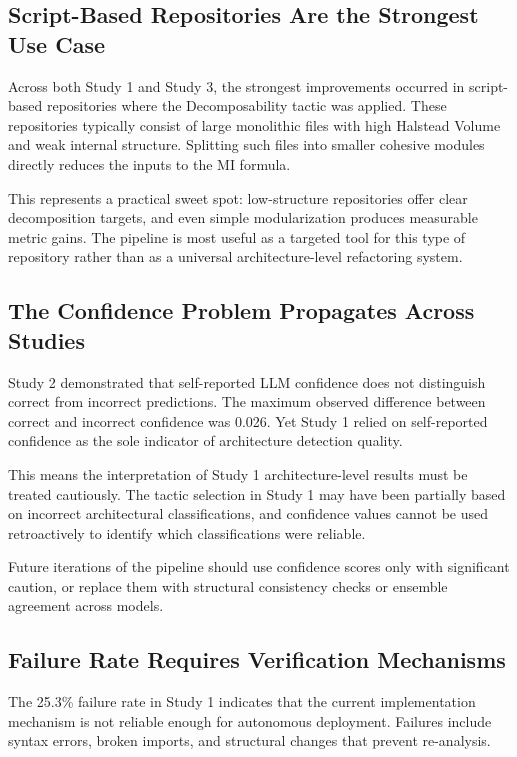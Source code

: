 \subsection{Script-Based Repositories Are the Strongest Use Case}

Across both Study 1 and Study 3, the strongest improvements occurred in script-based repositories where the Decomposability tactic was applied. These repositories typically consist of large monolithic files with high Halstead Volume and weak internal structure. Splitting such files into smaller cohesive modules directly reduces the inputs to the MI formula.

This represents a practical sweet spot: low-structure repositories offer clear decomposition targets, and even simple modularization produces measurable metric gains. The pipeline is most useful as a targeted tool for this type of repository rather than as a universal architecture-level refactoring system.

\subsection{The Confidence Problem Propagates Across Studies}

Study 2 demonstrated that self-reported LLM confidence does not distinguish correct from incorrect predictions. The maximum observed difference between correct and incorrect confidence was 0.026. Yet Study 1 relied on self-reported confidence as the sole indicator of architecture detection quality.

This means the interpretation of Study 1 architecture-level results must be treated cautiously. The tactic selection in Study 1 may have been partially based on incorrect architectural classifications, and confidence values cannot be used retroactively to identify which classifications were reliable.

Future iterations of the pipeline should use confidence scores only with significant caution, or replace them with structural consistency checks or ensemble agreement across models.

\subsection{Failure Rate Requires Verification Mechanisms}

The 25.3\% failure rate in Study 1 indicates that the current implementation mechanism is not reliable enough for autonomous deployment. Failures include syntax errors, broken imports, and structural changes that prevent re-analysis.

